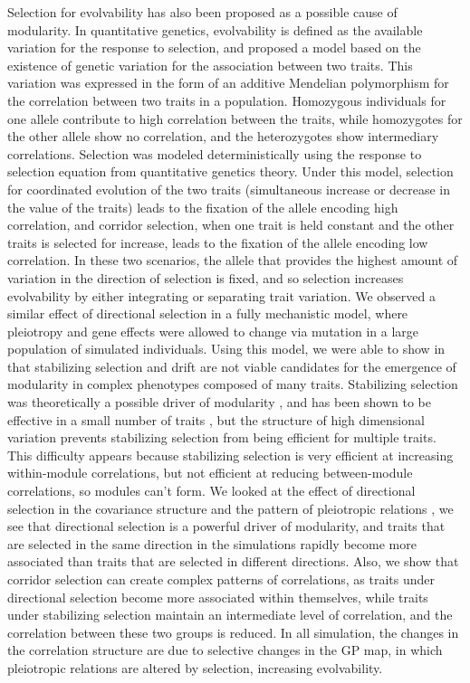 \begin{refsection}
Selection for evolvability has
also been proposed as a possible cause of modularity. In quantitative
genetics, evolvability is defined as the available variation for the
response to selection, and \textcite{Pavlicev2011-wz}
proposed a model based on the existence of genetic variation for the
association between two traits. This variation was expressed in the form
of an additive Mendelian polymorphism for the correlation between two
traits in a population. Homozygous individuals for one allele contribute
to high correlation between the traits, while homozygotes for the other
allele show no correlation, and the heterozygotes show intermediary
correlations. Selection was modeled deterministically using the response
to selection equation from quantitative genetics theory. 
Under this model, selection for coordinated
evolution of the two traits (simultaneous increase or decrease in the
value of the traits) leads to the fixation of the allele encoding high
correlation, and corridor selection, when one trait is held constant and
the other traits is selected for increase, leads to the fixation of the
allele encoding low correlation. In these two scenarios, the allele that
provides the highest amount of variation in the direction of selection
is fixed, and so selection increases evolvability by either integrating
or separating trait variation. We observed a similar effect of
directional selection in a fully mechanistic model, where pleiotropy and
gene effects were allowed to change via mutation in a large population
of simulated individuals. Using this model, we were able to show in
\textcite{Melo2015-bk} that stabilizing selection and drift are not viable
candidates for the emergence of modularity in complex phenotypes
composed of many traits. Stabilizing selection was theoretically a
possible driver of modularity \parencite{Lande1980-kn, Cheverud1984-mi}, and
has been shown to be effective in a small number of traits
\parencite{Jones2007-xe, Jones2014-wj}, but the structure of high
dimensional variation prevents stabilizing selection from being
efficient for multiple traits. This difficulty appears because
stabilizing selection is very efficient at increasing within-module
correlations, but not efficient at reducing between-module correlations,
so modules can't form. We looked at the effect of directional selection
in the covariance structure and the pattern of pleiotropic relations
\parencite{Melo2016-yw}, we see that directional selection is a powerful
driver of modularity, and traits that are selected in the same direction
in the simulations rapidly become more associated than traits that are
selected in different directions. Also, we show that corridor selection
can create complex patterns of correlations, as traits under directional
selection become more associated within themselves, while traits under
stabilizing selection maintain an intermediate level of correlation, and
the correlation between these two groups is reduced. In all simulation,
the changes in the correlation structure are due to selective changes in
the GP map, in which pleiotropic relations are altered by selection,
increasing evolvability.


\end{refsection}
